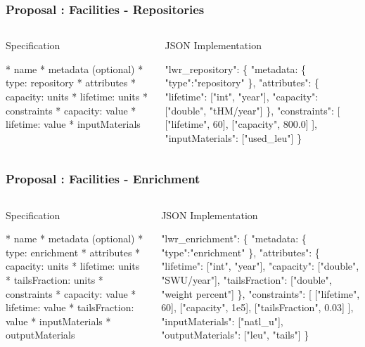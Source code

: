 \begin{frame}[fragile]
  \frametitle{Proposal : Facilities - Repositories}
  \begin{columns}[t]
    \begin{block}{Specification}\begin{small}\begin{semiverbatim}
* name
  * metadata (optional)
    * type: repository
  * attributes
    * capacity: units
    * lifetime: units
  * constraints
    * capacity: value
    * lifetime: value
  * inputMaterials
    \end{semiverbatim}\end{small}\end{block}
    \begin{block}{JSON Implementation}\begin{small}\begin{semiverbatim}
"lwr_repository": \{
  "metadata: \{
    "type":"repository"
  \},
  "attributes": \{
    "lifetime": ["int", "year"], 
    "capacity": ["double", "tHM/year"]
  \},
  "constraints": [
    ["lifetime", 60], 
    ["capacity", 800.0]
   ], 
 "inputMaterials": ["used_leu"]
\}
    \end{semiverbatim}\end{small}\end{block}
  \end{columns}
\end{frame}

\begin{frame}[fragile]
  \frametitle{Proposal : Facilities - Enrichment}
  \begin{columns}[t]
    \begin{block}{Specification}\begin{footnotesize}\begin{semiverbatim}
* name
  * metadata (optional)
    * type: enrichment
  * attributes
    * capacity: units
    * lifetime: units
    * tailsFraction: units
  * constraints
    * capacity: value
    * lifetime: value
    * tailsFraction: value
  * inputMaterials
  * outputMaterials
    \end{semiverbatim}\end{footnotesize}\end{block}
    \begin{block}{JSON Implementation}\begin{footnotesize}\begin{semiverbatim}
"lwr_enrichment": \{
  "metadata: \{
    "type":"enrichment"
  \},
  "attributes": \{
    "lifetime": ["int", "year"], 
    "capacity": ["double", "SWU/year"],
    "tailsFraction": ["double", 
                      "weight percent"]
  \},
  "constraints": [
    ["lifetime", 60], 
    ["capacity", 1e5],
    ["tailsFraction", 0.03]
  ], 
  "inputMaterials": ["natl_u"],
  "outputMaterials": ["leu", "tails"]
\}
    \end{semiverbatim}\end{footnotesize}\end{block}
  \end{columns}
\end{frame}


